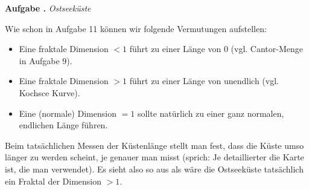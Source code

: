 \documentclass[a4paper,ngerman,12pt]{scrartcl}
\theoremstyle{definition}
\theoremstyle{plain}
\theoremstyle{remark}
\newlength{\aufgabenskip}
\newcounter{aufgabennummer}
\newenvironment{aufgabe}[1]{
  \addtocounter{aufgabennummer}{1}
  \textbf{Aufgabe \theaufgabennummer.} \emph{#1} \par
}{\vspace{\aufgabenskip}}
\begin{document}
\begin{aufgabe}{Ostseeküste}
	Wie schon in Aufgabe 11 können wir folgende Vermutungen aufstellen:
	\begin{itemize}
		\item Eine fraktale Dimension $< 1$ führt zu einer Länge von $0$ (vgl. Cantor-Menge in Aufgabe 9).
		\item Eine fraktale Dimension $> 1$ führt zu einer Länge von unendlich (vgl. Kochsce Kurve).
		\item Eine (normale) Dimension $= 1$ sollte natürlich zu einer ganz normalen, endlichen Länge führen.
	\end{itemize}
	
	Beim tatsächlichen Messen der Küstenlänge stellt man fest, dass die Küste umso länger zu werden scheint, je genauer man misst (sprich: Je detaillierter die Karte ist, die man verwendet). Es sieht also so aus als wäre die Ostseeküste tatsächlich ein Fraktal der Dimension $> 1$.
\end{aufgabe}
\end{document}
